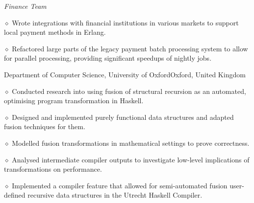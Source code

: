 {\it Finance Team}
\parindent=20pt
\item{$\diamond$} Wrote integrations with financial institutions in various markets to support local
payment methods in Erlang.
\item{$\diamond$} Refactored large parts of the legacy payment batch processing system to allow for parallel
processing, providing significant speedups of nightly jobs. 
\parindent=0pt



\bigskip


{Department of Computer Science, University of Oxford}{Oxford, United Kingdom}
\medskip

\parindent=20pt
\item{$\diamond$} Conducted research into using fusion of structural recursion as an automated, optimising program
transformation in Haskell. 
\item{$\diamond$} Designed and implemented purely functional data
structures and adapted fusion
techniques for them. 
\item{$\diamond$} Modelled fusion transformations in mathematical
settings to prove correctness.  
\item{$\diamond$} Analysed intermediate compiler outputs to investigate low-level implications of
transformations on performance.
\item{$\diamond$} Implemented a compiler feature that allowed for semi-automated fusion user-defined recursive data structures in the Utrecht Haskell Compiler.
\parindent=0pt

\bigskip

%

